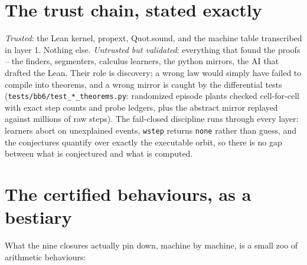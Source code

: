 \documentclass[11pt]{article}
\begin{document}
\section*{The trust chain, stated exactly}

\emph{Trusted}: the Lean kernel, \textsf{propext},
\textsf{Quot.sound}, and the machine table transcribed in layer 1.
Nothing else. \emph{Untrusted but validated}: everything that found
the proofs -- the finders, segmenters, calculus learners, the python
mirrors, the AI that drafted the Lean. Their role is discovery; a
wrong law would simply have failed to compile into theorems, and a
wrong mirror is caught by the differential tests
(\texttt{tests/bb6/test\_*\_theorems.py}: randomized episode plants
checked cell-for-cell with exact step counts and probe ledgers, plus
the abstract mirror replayed against millions of raw steps). The
fail-closed discipline runs through every layer: learners abort on
unexplained events, \texttt{wstep} returns \texttt{none} rather than
guess, and the conjectures quantify over exactly the executable
orbit, so there is no gap between what is conjectured and what is
computed.

\section*{The certified behaviours, as a bestiary}

What the nine closures actually pin down, machine by machine, is a
small zoo of arithmetic behaviours:
\end{document}
